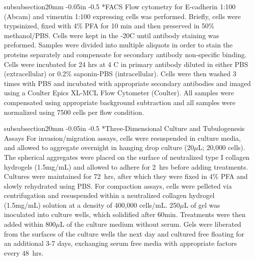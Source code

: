 \documentclass[12pt]{article}
\makeatletter
\renewcommand\subsubsection{\@startsection
	{subsubsection}{2}{0mm}
	{-0.05in}
	{-0.5\baselineskip}
	{\normalfont\normalsize\itshape}}
\makeatother
\begin{document}
\subsubsection*{FACS}
Flow cytometry for E-cadherin 1:100 (Abcam) and vimentin 1:100 expressing cells was performed.  Briefly, cells were trypsinized, fixed with 4\% PFA for 10 min and then preserved in 50\% methanol/PBS.  Cells were kept in the -20C until antibody staining was preformed.   Samples were divided into multiple aliquots in order to stain the proteins separately and compensate for secondary antibody non-specific binding. Cells were incubated for 24 hrs at 4 C in primary antibody diluted in either PBS (extracellular) or 0.2\% saponin-PBS (intracellular). Cells were then washed 3 times with PBS and incubated with appropriate secondary antibodies and imaged using a Coulter Epics XL-MCL Flow Cytometer (Coulter).  All samples were compensated using appropriate background subtraction and all samples were normalized using 7500 cells per flow condition.

\subsubsection*{Three-Dimensional Culture and Tubulogenesis Assays}
For invasion/migration assays, cells were resuspended in culture media, and allowed to aggregate overnight in hanging drop culture (20$\mu$L; 20,000 cells). The spherical aggregates were placed on the surface of neutralized type I collagen hydrogels (1.5mg/mL) and allowed to adhere for 2~hrs before adding treatments. Cultures were maintained for 72~hrs, after which they were fixed in 4\% PFA and slowly rehydrated using PBS. For compaction assays, cells were pelleted via centrifugation and resuspended within a neutralized collagen hydrogel (1.5mg/mL) solution at a density of 400,000 cells/mL.  250$\mu$L of gel was inoculated into culture wells, which solidified after 60min. Treatments were then added within 800$\mu$L of the culture medium without serum. Gels were liberated from the surfaces of the culture wells the next day and cultured free floating for an additional 3-7 days, exchanging serum free media with appropriate factors every 48~hrs.
\end{document}
